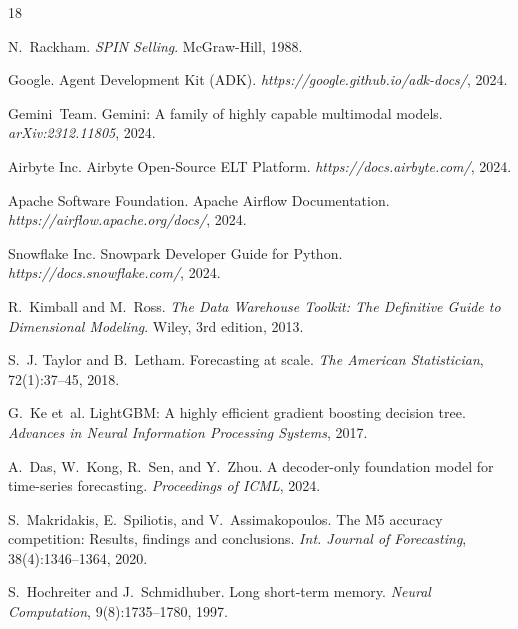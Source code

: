 \documentclass[11pt,a4paper]{article}
\begin{document}

\begin{thebibliography}{18}

N.~Rackham. \emph{SPIN Selling}. McGraw-Hill, 1988.

Google. Agent Development Kit (ADK). \emph{https://google.github.io/adk-docs/}, 2024.

Gemini~Team. Gemini: A family of highly capable multimodal models. \emph{arXiv:2312.11805}, 2024.

Airbyte Inc. Airbyte Open-Source ELT Platform. \emph{https://docs.airbyte.com/}, 2024.

Apache Software Foundation. Apache Airflow Documentation. \emph{https://airflow.apache.org/docs/}, 2024.

Snowflake Inc. Snowpark Developer Guide for Python. \emph{https://docs.snowflake.com/}, 2024.

R.~Kimball and M.~Ross. \emph{The Data Warehouse Toolkit: The Definitive Guide to Dimensional Modeling}. Wiley, 3rd edition, 2013.

S.~J. Taylor and B.~Letham. Forecasting at scale. \emph{The American Statistician}, 72(1):37--45, 2018.

G.~Ke et~al. LightGBM: A highly efficient gradient boosting decision tree. \emph{Advances in Neural Information Processing Systems}, 2017.

A.~Das, W.~Kong, R.~Sen, and Y.~Zhou. A decoder-only foundation model for time-series forecasting. \emph{Proceedings of ICML}, 2024.

S.~Makridakis, E.~Spiliotis, and V.~Assimakopoulos. The M5 accuracy competition: Results, findings and conclusions. \emph{Int. Journal of Forecasting}, 38(4):1346--1364, 2020.

S.~Hochreiter and J.~Schmidhuber. Long short-term memory. \emph{Neural Computation}, 9(8):1735--1780, 1997.


\end{thebibliography}
\end{document}
